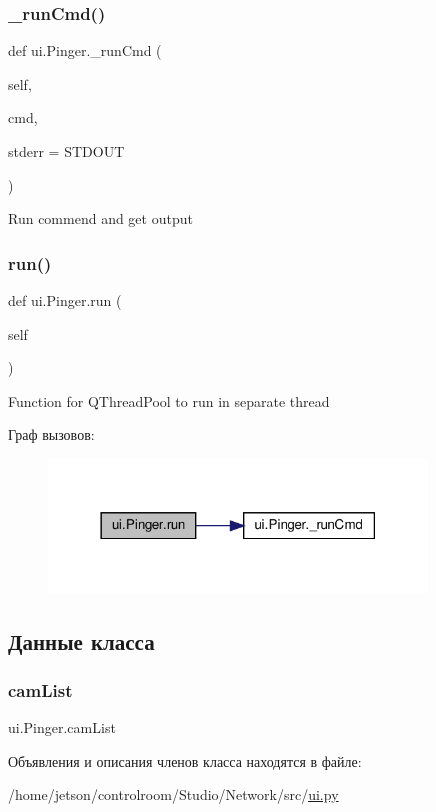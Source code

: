 \subsubsection{\texorpdfstring{\+\_\+run\+Cmd()}{\_runCmd()}}
{\footnotesize\ttfamily def ui.\+Pinger.\+\_\+run\+Cmd (\begin{DoxyParamCaption}\item[{}]{self,  }\item[{}]{cmd,  }\item[{}]{stderr = {\ttfamily STDOUT} }\end{DoxyParamCaption})\hspace{0.3cm}{\ttfamily [private]}}

\begin{DoxyVerb}Run commend and get output \end{DoxyVerb}
 \mbox{\label{classui_1_1_pinger_ab94b3da4c7611e8075fa7fe7adb0c901}} 
\subsubsection{\texorpdfstring{run()}{run()}}
{\footnotesize\ttfamily def ui.\+Pinger.\+run (\begin{DoxyParamCaption}\item[{}]{self }\end{DoxyParamCaption})}

\begin{DoxyVerb}Function for QThreadPool to run in separate thread \end{DoxyVerb}
 Граф вызовов\+:\nopagebreak
\begin{figure}[H]
\begin{center}
\leavevmode
\includegraphics[width=285pt]{classui_1_1_pinger_ab94b3da4c7611e8075fa7fe7adb0c901_cgraph}
\end{center}
\end{figure}


\subsection{Данные класса}
\mbox{\label{classui_1_1_pinger_ac752aa12f824b1fd0ce9b94f7b3b14fe}} 
\subsubsection{\texorpdfstring{cam\+List}{camList}}
{\footnotesize\ttfamily ui.\+Pinger.\+cam\+List}



Объявления и описания членов класса находятся в файле\+:\begin{DoxyCompactItemize}
\item 
/home/jetson/controlroom/\+Studio/\+Network/src/\hyperlink{ui_8py}{ui.\+py}\end{DoxyCompactItemize}
